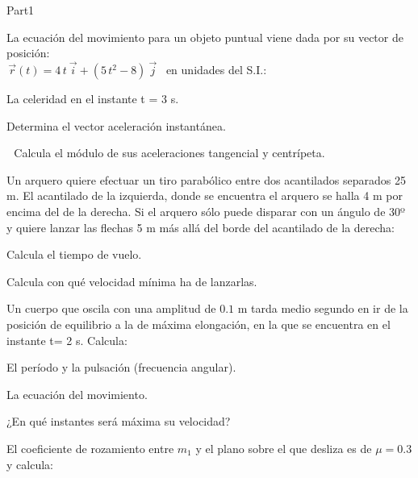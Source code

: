 \documentclass[9pt]{scrartcl}
\begin{document}
\begin{exam}{Part1}
\begin{onehalfspace}
\begin{problem*}[\auto]La ecuación del movimiento para un objeto puntual viene dada por su vector de posición:\\  \,$\vec{r}(t)=4\,t \ \vec{i} + (5\,t^2 -8)\ \vec{j}$ \, en unidades del S.I.:
\begin{parts}
\item {} La celeridad en el instante t = 3 s.
\item Determina el vector aceleración instantánea.
\item \,  \,Calcula el módulo de sus aceleraciones tangencial y centrípeta.
\end{parts}
 \begin{solution}
\phantom{}
\end{solution}
\end{problem*}
\begin{problem*}[10ea]
Un arquero quiere efectuar un tiro parabólico entre dos acantilados separados 25 m. El acantilado de la izquierda, donde se encuentra el arquero se halla 4 m por encima del de la derecha. Si el arquero sólo puede disparar con un ángulo de 30º y quiere lanzar las flechas 5 m más allá del borde del acantilado de la derecha: 
\begin{parts}
\item Calcula el tiempo de vuelo. 
\item Calcula con qué velocidad mínima ha de lanzarlas.
\end{parts}
\end{problem*}
\begin{problem*}[10ea]Un cuerpo que oscila con una amplitud de $0.1$ m tarda
medio segundo en ir de la posición de equilibrio a la de máxima elongación,
en la que se encuentra en el instante t= 2 s. Calcula:
\begin{parts}
\item El período y la pulsación (frecuencia angular).
\item La ecuación del movimiento.
\item ¿En qué instantes será máxima su velocidad?
\end{parts}
\end{problem*}
 \begin{problem*}[10ea] 
El coeficiente de rozamiento entre $m_1$ y el plano sobre el que desliza es de $\mu=0.3$ y calcula: \\

\end{problem*}
\end{onehalfspace}
\end{exam}
\end{document}
